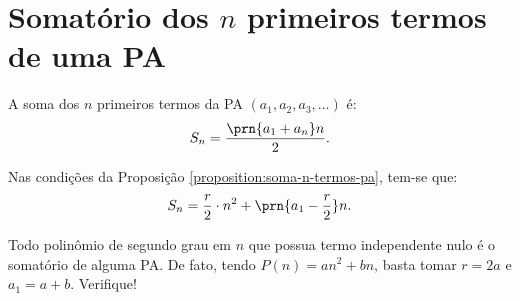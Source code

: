 \section{Somatório dos $n$ primeiros termos de uma PA}

\begin{proposition}
\label{proposition:soma-n-termos-pa}
A soma dos $n$ primeiros termos da PA $(a_1, a_2, a_3, \dots)$ é:
%
\begin{equation*}
S_n = \frac {\prn {a_1+a_n}n} 2.
\end{equation*}
\end{proposition}

\begin{corollary}
Nas condições da Proposição \ref{proposition:soma-n-termos-pa}, tem-se que:
%
\begin{equation*}
S_n = \frac r 2 \cdot n^2 + \prn{a_1 - \frac r 2}n.
\end{equation*}
\end{corollary}

\begin{remark}
Todo polinômio de segundo grau em $n$ que possua termo independente nulo é o somatório de alguma PA. De fato, tendo $P(n) = an^2 + bn$, basta tomar $r = 2a$ e $a_1 = a+b$. Verifique!
\end{remark}